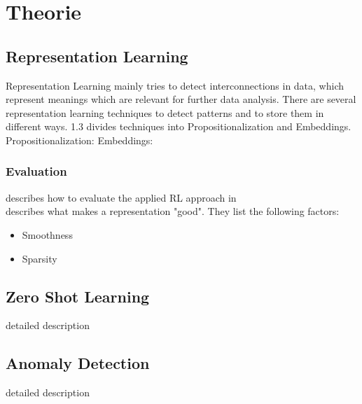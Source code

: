 \chapter{Theorie}\label{theory}
\section{Representation Learning}
Representation Learning mainly tries to detect interconnections in data, which represent meanings which are relevant for further data analysis. There are several representation learning techniques to detect patterns and to store them in different ways.\cite{lavrac_representation_2021} 1.3
divides techniques into Propositionalization and Embeddings.\\
Propositionalization:
Embeddings:

\subsection{Evaluation}
describes how to evaluate the applied RL approach in\\
\cite{bengio_representation_2013} describes what makes a representation "good". They list the following factors:\\
\begin{itemize}
  \item Smoothness
  \item Sparsity
\end{itemize}
\section{Zero Shot Learning}
detailed description
\section{Anomaly Detection}
detailed description
